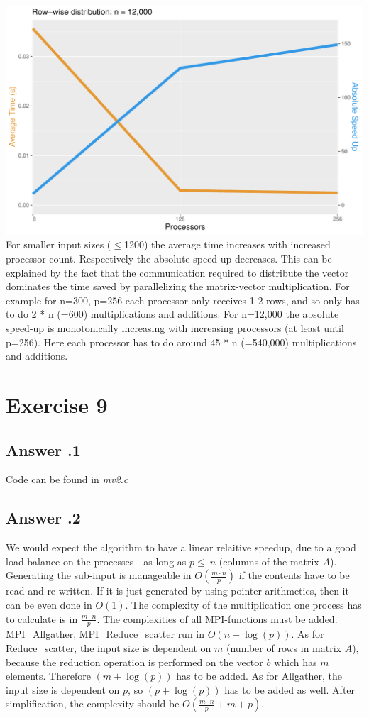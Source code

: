 \documentclass[a4paper,%
11pt,%
DIV=12,
headsepline,%
headings=normal,
]{scrartcl}
\newcounter{curex}
\newcommand{\exercise}[1]{\section*{Exercise #1}\setcounter{curex}{#1}}
\newcommand{\answer}[1]{\subsection*{Answer \arabic{curex}.#1}}
\begin{document}
\includegraphics[scale=0.4,page=1]{../plots/matrix_vector_plot_Row-wise-distribution_12000} \\

\noindent For smaller input sizes ($\leq$1200) the average time increases with increased processor count. Respectively the absolute speed up decreases. This can be explained by the fact that the communication required to distribute the vector dominates the time saved by parallelizing the matrix-vector multiplication. For example for n=300, p=256 each processor only receives 1-2 rows, and so only has to do 2 * n (=600) multiplications and additions. For n=12,000 the absolute speed-up is monotonically increasing with increasing processors (at least until p=256). Here each processor has to do around 45 * n (=540,000) multiplications and additions.

\exercise{9}

\answer{1}
Code can be found in \textit{mv2.c}
\answer{2}
We would expect the algorithm to have a linear relaitive speedup, due to a good load balance on the processes - as long as $p \leq\ n$  (columns of the matrix $A$). Generating the sub-input is manageable in $O\left(\frac{m \cdot n}{p}\right)$ if the contents have to be read and re-written. If it is just generated by using pointer-arithmetics, then  it can be even done in $O\left(1\right)$. The complexity of the multiplication one process has to calculate is in $\frac{m \cdot n}{p}$. The complexities of all MPI-functions must be added. MPI\_Allgather,  MPI\_Reduce\_scatter run in $O(n + \log(p))$. As for Reduce\_scatter, the input size is dependent on $m$ (number of rows in matrix $A$), because the reduction operation is performed on the vector $b$ which has $m$ elements. Therefore $(m + \log(p))$ has to be added. As for Allgather, the input size is dependent on $p$, so $(p + \log(p))$ has to be added as well. After simplification, the complexity should be $O\left(\frac{m \cdot n}{p} + m + p\right)$.\\
\end{document}

